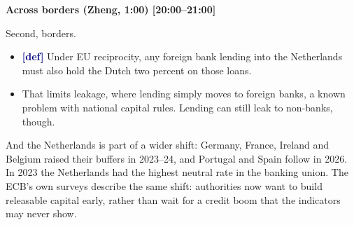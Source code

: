 {\small\textbf{Across borders (Zheng, 1:00) [20:00–21:00]}}\par\smallskip
Second, borders.
\begin{itemize}\setlength\itemsep{0pt}
\item \textcolor{navy}{\textbf{[def]}} Under EU reciprocity, any foreign bank lending into the Netherlands must also hold the Dutch two percent on those loans.
\item That limits leakage, where lending simply moves to foreign banks, a known problem with national capital rules. Lending can still leak to non-banks, though.
\end{itemize}
\par\smallskip
And the Netherlands is part of a wider shift: Germany, France, Ireland and Belgium raised their buffers in 2023–24, and Portugal and Spain follow in 2026. In 2023 the Netherlands had the highest neutral rate in the banking union. The ECB's own surveys describe the same shift: authorities now want to build releasable capital early, rather than wait for a credit boom that the indicators may never show.

